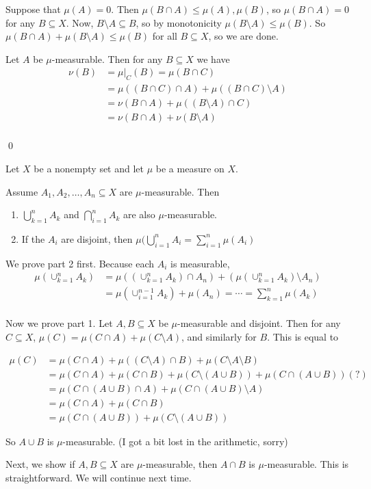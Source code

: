 \documentclass[x11names,reqno,14pt]{extarticle}
\begin{document}
Suppose that $\mu(A) = 0$. Then $\mu(B\cap A) \leq \mu(A), \mu(B)$, so $\mu(B\cap A) = 0$ for any $B\subseteq X$. Now, $B\setminus A \subseteq B$, so by monotonicity $\mu(B\setminus A)\leq\mu(B)$. So $\mu(B \cap A) + \mu(B\setminus A) \leq \mu(B)$ for all $B \subseteq X$, so we are done. 

Let $A$ be $\mu$-measurable. Then for any $B\subseteq X$ we have 
\begin{align*}
\nu(B) & = \mu|_C(B) = \mu(B \cap C) \\
		 & = \mu((B\cap C) \cap A) + \mu((B\cap C)\setminus A) \\
		 & = \nu(B \cap A) + \mu((B\setminus A) \cap C)\\
		 & = \nu(B \cap A) + \nu(B\setminus A) \\
\end{align*}

\qed

\thm

Let $X$ be a nonempty set and let $\mu$ be a measure on $X$. 

Assume $A_1, A_2, \dots, A_n\subseteq X$ are $\mu$-measurable. Then
\begin{enumerate}
\item $\bigcup_{k=1}^n A_k$ and $\bigcap_{i=1}^nA_k$ are also $\mu$-measurable. 
\item If the $A_i$ are disjoint, then $\mu(\bigcup_{i=1}^nA_i = \sum_{i=1}^n\mu(A_i)$
\end{enumerate}

\proof

We prove part 2 first. Because each $A_i$ is measurable, 
\begin{align*}
\mu(\cup_{k=1}^nA_k) & = \mu((\cup_{k=1}^nA_k)\cap A_n) + (\mu(\cup_{k=1}^nA_k) \setminus A_n) \\
& = \mu(\cup_{i=1}^{n - 1}A_k) + \mu(A_n) = \cdots = \sum_{k=1}^n\mu(A_k) \\
\end{align*}

Now we prove part 1. Let $A, B \subseteq X$ be $\mu$-measurable and disjoint. Then for any $C\subseteq X$, $\mu(C) = \mu(C \cap A) + \mu(C\setminus A)$, and similarly for $B$. This is equal to 

\begin{align*}
\mu(C) & = \mu(C \cap A) + \mu((C\setminus A) \cap B) + \mu(C\setminus A \setminus B) \\
		 & = \mu(C\cap A) + \mu(C\cap B) + \mu(C\setminus(A\cup B)) + \mu(C\cap(A\cup B)) (?)\\
		 & = \mu(C \cap (A \cup B) \cap A) + \mu(C \cap (A \cup B) \setminus A) \\
		 & = \mu(C \cap A) + \mu(C\cap B) \\
		 & = \mu(C \cap (A \cup B)) + \mu(C\setminus(A \cup B))
\end{align*}

So $A \cup B$ is $\mu$-measurable. (I got a bit lost in the arithmetic, sorry)

Next, we show if $A, B\subseteq X$ are $\mu$-measurable, then $A \cap B$ is $\mu$-measurable. This is straightforward. We will continue next time. 
\end{document}
